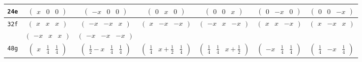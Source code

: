 \documentclass[fleqn,9pt,landscape]{jsarticle}
\begin{document}
\begin{center}
\begin{longtable}{ccccccc}
{\tt 24e} & $ \begin{pmatrix} x & 0 & 0 \end{pmatrix} $ & $ \begin{pmatrix} - x & 0 & 0 \end{pmatrix} $ & $ \begin{pmatrix} 0 & x & 0 \end{pmatrix} $ & $ \begin{pmatrix} 0 & 0 & x \end{pmatrix} $ & $ \begin{pmatrix} 0 & - x & 0 \end{pmatrix} $ & $ \begin{pmatrix} 0 & 0 & - x \end{pmatrix} $ \\ \hline
{\tt 32f} & $ \begin{pmatrix} x & x & x \end{pmatrix} $ & $ \begin{pmatrix} - x & - x & x \end{pmatrix} $ & $ \begin{pmatrix} x & - x & - x \end{pmatrix} $ & $ \begin{pmatrix} - x & x & - x \end{pmatrix} $ & $ \begin{pmatrix} x & x & - x \end{pmatrix} $ & $ \begin{pmatrix} x & - x & x \end{pmatrix} $ \\
& $ \begin{pmatrix} - x & x & x \end{pmatrix} $ & $ \begin{pmatrix} - x & - x & - x \end{pmatrix} $ & $  $ & $  $ & $  $ & $  $ \\ \hline
{\tt 48g} & $ \begin{pmatrix} x & \frac{1}{4} & \frac{1}{4} \end{pmatrix} $ & $ \begin{pmatrix} \frac{1}{2} - x & \frac{1}{4} & \frac{1}{4} \end{pmatrix} $ & $ \begin{pmatrix} \frac{1}{4} & x + \frac{1}{2} & \frac{1}{4} \end{pmatrix} $ & $ \begin{pmatrix} \frac{1}{4} & \frac{1}{4} & x + \frac{1}{2} \end{pmatrix} $ & $ \begin{pmatrix} - x & \frac{1}{4} & \frac{1}{4} \end{pmatrix} $ & $ \begin{pmatrix} \frac{1}{4} & - x & \frac{1}{4} \end{pmatrix} $ \\

\end{longtable}
\end{center}
\end{document}
